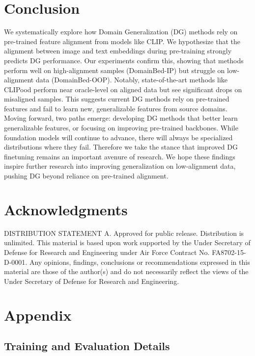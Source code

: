 \documentclass{article} %
\begin{document}
\section{Conclusion} 

We systematically explore how Domain Generalization (DG) methods rely on pre-trained feature alignment from models like CLIP. We hypothesize that the alignment between image and text embeddings during pre-training strongly predicts DG performance. Our experiments confirm this, showing that methods perform well on high-alignment samples (DomainBed-IP) but struggle on low-alignment data (DomainBed-OOP). Notably, state-of-the-art methods like CLIPood perform near oracle-level on aligned data but see significant drops on misaligned samples. This suggests current DG methods rely on pre-trained features and fail to learn new, generalizable features from source domains. Moving forward, two paths emerge: developing DG methods that better learn generalizable features, or focusing on improving pre-trained backbones. While foundation models will continue to advance, there will always be specialized distributions where they fail. Therefore we take the stance that improved DG finetuning remains an important avenure of research.  We hope these findings inspire further research into improving generalization on low-alignment data, pushing DG beyond reliance on pre-trained alignment.


\section{Acknowledgments}

DISTRIBUTION STATEMENT A. Approved for public release. Distribution is unlimited. This material is based upon work supported by the Under Secretary of Defense for Research and Engineering under Air Force Contract No. FA8702-15-D-0001. Any opinions, findings, conclusions or recommendations expressed in this material are those of the author(s) and do not necessarily reflect the views of the Under Secretary of Defense for Research and Engineering.





\appendix
\section{Appendix}



 

\subsection{Training and Evaluation Details}
\end{document}
